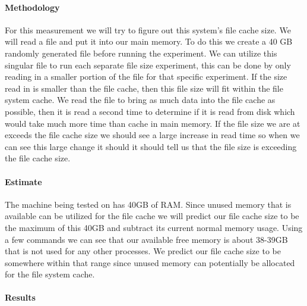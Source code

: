 
\paragraph{Methodology}

For this measurement we will try to figure out this system's file cache size. We will read a file and put it into our main memory. To do this we create a 40 GB randomly generated file before running the experiment. We can utilize this singular file to run each separate file size experiment, this can be done by only reading in a smaller portion of the file for that specific experiment. If the size read in is smaller than the file cache, then this file size will fit within the file system cache. We read the file to bring as much data into the file cache as possible, then it is read a second time to determine if it is read from disk which would take much more time than cache in main memory. If the file size we are at exceeds the file cache size we should see a large increase in read time so when we can see this large change it should it should tell us that the file size is exceeding the file cache size. 

\paragraph{Estimate}

The machine being tested on has 40GB of RAM. Since unused memory that is available can be utilized for the file cache we will predict our file cache size to be the maximum of this 40GB and subtract its current normal memory usage. Using a few commands we can see that our available free memory is about 38-39GB that is not used for any other processes. We predict our file cache size to be somewhere within that range since unused memory can potentially be allocated for the file system cache.

\paragraph{Results}

